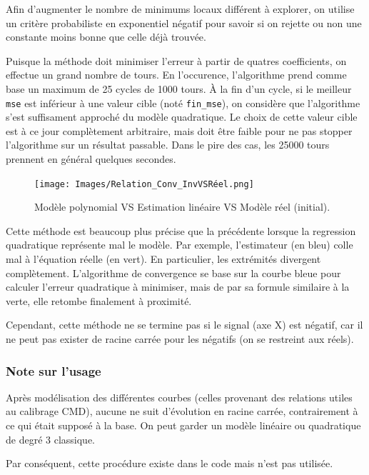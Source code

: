\documentclass[12pt]{article}
\begin{document}
    Afin d'augmenter le nombre de minimums locaux différent à explorer, on utilise un critère probabiliste en exponentiel négatif pour savoir si on rejette ou non une constante moins bonne que celle déjà trouvée.
    
    Puisque la méthode doit minimiser l'erreur à partir de quatres coefficients, on effectue un grand nombre de tours. En l'occurence, l'algorithme prend comme base un maximum de 25 cycles de 1000 tours. À la fin d'un cycle, si le meilleur \texttt{mse} est inférieur à une valeur cible (noté \texttt{fin\_mse}), on considère que l'algorithme s'est suffisament approché du modèle quadratique. Le choix de cette valeur cible est à ce jour complètement arbitraire, mais doit être faible pour ne pas stopper l'algorithme sur un résultat passable. Dans le pire des cas, les 25000 tours prennent en général quelques secondes.

    \begin{figure}[ht!]
        \centering
        \texttt{[image: Images/Relation\_Conv\_InvVSRéel.png]}  
        \caption{Modèle polynomial VS Estimation linéaire VS Modèle réel (initial).}
    \end{figure}

    Cette méthode est beaucoup plus précise que la précédente lorsque la regression quadratique représente mal le modèle. Par exemple, l'estimateur (en bleu) colle mal à l'équation réelle (en vert). En particulier, les extrémités divergent complètement. L'algorithme de convergence se base sur la courbe bleue pour calculer l'erreur quadratique à minimiser, mais de par sa formule similaire à la verte, elle retombe finalement à proximité.

    Cependant, cette méthode ne se termine pas si le signal (axe X) est négatif, car il ne peut pas exister de racine carrée pour les négatifs (on se restreint aux réels).
    
    \subsubsection{Note sur l'usage}

    Après modélisation des différentes courbes (celles provenant des relations utiles au calibrage CMD), aucune ne suit d'évolution en racine carrée, contrairement à ce qui était supposé à la base. On peut garder un modèle linéaire ou quadratique de degré 3 classique.

    Par conséquent, cette procédure existe dans le code mais n'est pas utilisée.
    
\end{document}
